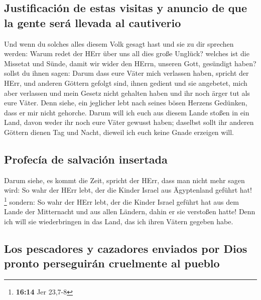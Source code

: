 \hypertarget{justificaciuxf3n-de-estas-visitas-y-anuncio-de-que-la-gente-seruxe1-llevada-al-cautiverio}{%
\subsection{Justificación de estas visitas y anuncio de que la gente
será llevada al
cautiverio}\label{justificaciuxf3n-de-estas-visitas-y-anuncio-de-que-la-gente-seruxe1-llevada-al-cautiverio}}

 Und wenn du solches alles diesem Volk gesagt hast und
sie zu dir sprechen werden: Warum redet der HErr über uns all dies große
Unglück? welches ist die Missetat und Sünde, damit wir wider den HErrn,
unseren Gott, gesündigt haben?  sollst du ihnen sagen:
Darum dass eure Väter mich verlassen haben, spricht der HErr, und
anderen Göttern gefolgt sind, ihnen gedient und sie angebetet, mich aber
verlassen und mein Gesetz nicht gehalten haben  und ihr
noch ärger tut als eure Väter. Denn siehe, ein jeglicher lebt nach
seines bösen Herzens Gedünken, dass er mir nicht gehorche.
 Darum will ich euch aus diesem Lande stoßen in ein Land,
davon weder ihr noch eure Väter gewusst haben; daselbst sollt ihr
anderen Göttern dienen Tag und Nacht, dieweil ich euch keine Gnade
erzeigen will.

\hypertarget{profecuxeda-de-salvaciuxf3n-insertada}{%
\subsection{Profecía de salvación
insertada}\label{profecuxeda-de-salvaciuxf3n-insertada}}

 Darum siehe, es kommt die Zeit, spricht der HErr, dass
man nicht mehr sagen wird: So wahr der HErr lebt, der die Kinder Israel
aus Ägyptenland geführt hat! \footnote{\textbf{16:14} Jer 23,7-8}
 sondern: So wahr der HErr lebt, der die Kinder Israel
geführt hat aus dem Lande der Mitternacht und aus allen Ländern, dahin
er sie verstoßen hatte! Denn ich will sie wiederbringen in das Land, das
ich ihren Vätern gegeben habe.

\hypertarget{los-pescadores-y-cazadores-enviados-por-dios-pronto-perseguiruxe1n-cruelmente-al-pueblo}{%
\subsection{Los pescadores y cazadores enviados por Dios pronto
perseguirán cruelmente al
pueblo}\label{los-pescadores-y-cazadores-enviados-por-dios-pronto-perseguiruxe1n-cruelmente-al-pueblo}}

